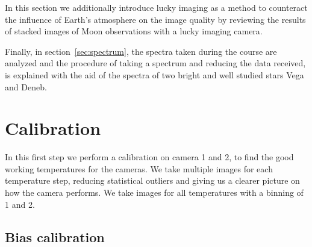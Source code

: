 \documentclass{article}
\begin{document}
In this section we additionally introduce lucky imaging as a method to counteract the influence of Earth's atmosphere on the image quality by reviewing the results of stacked images of Moon observations with a lucky imaging camera. 

Finally, in section~\ref{sec:spectrum}, the spectra taken during the course are analyzed and the procedure of taking a spectrum and reducing the data received, is explained with the aid of the spectra of two bright and well studied stars Vega and Deneb.

  

\section{Calibration}\label{sec:calibration}
In this first step we perform a calibration on camera 1 and 2, to find the good working temperatures for the cameras. We take multiple images for each temperature step, reducing statistical outliers and giving us a clearer picture on how the camera performs. We take images for all temperatures with a binning of 1 and 2.
\subsection{Bias calibration}\label{sec:bias_calib}
\end{document}

